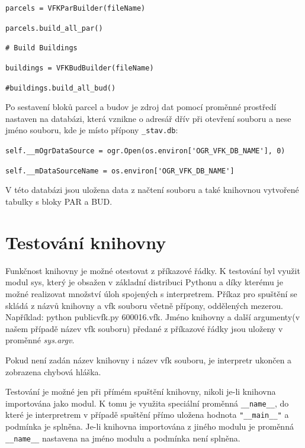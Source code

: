 \verb|parcels = VFKParBuilder(fileName)|

\verb|parcels.build_all_par()|

\verb|# Build Buildings|

\verb|buildings = VFKBudBuilder(fileName)|

\verb|#buildings.build_all_bud()|

Po sestavení bloků parcel a budov je zdroj dat pomocí proměnné prostředí nastaven na databázi, která vznikne o adresář dřív při otevření  souboru a nese jméno  souboru, kde je místo přípony \verb|_stav.db|:

\verb|self.__mOgrDataSource = ogr.Open(os.environ['OGR_VFK_DB_NAME'], 0)|

\verb|self.__mDataSourceName = os.environ['OGR_VFK_DB_NAME']| %

V této databázi jsou uložena data z načtení  souboru a také knihovnou vytvořené tabulky s bloky PAR a BUD.
\section{Testování knihovny}
Funkčnost knihovny je možné otestovat z příkazové řádky. K testování byl využit modul sys, který je obsažen v základní distribuci Pythonu a díky kterému je možné realizovat množství úloh spojených s interpretrem. Příkaz pro spuštění se skládá z názvů knihovny a vfk souboru včetně přípony, oddělených mezerou. Například: python publicvfk.py 600016.vfk. Jméno knihovny a další argumenty(v našem případě název vfk souboru) předané z příkazové řádky jsou uloženy v proměnné \textit{sys.argv}.

Pokud není zadán název knihovny i název vfk souboru, je interpretr ukončen a zobrazena chybová hláška.

Testování je možné jen při přímém spuštění knihovny, nikoli je-li knihovna importována jako modul. K tomu je využita speciální proměnná \verb|__name__|, do které je interpretrem v případě spuštění přímo uložena hodnota \verb|"__main__"| a podmínka je splněna. Je-li knihovna importována z jiného modulu je proměnná \verb|__name__| nastavena na jméno modulu a podmínka není splněna.
 
